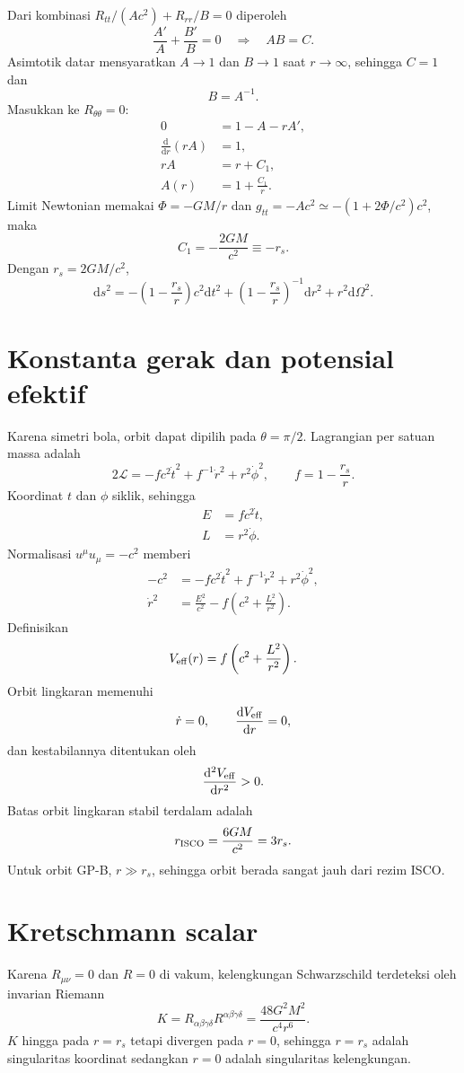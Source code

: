 \documentclass[12pt,a4paper]{report}
\newcommand{\dd}{\mathrm{d}}
\newcommand{\Lag}{\mathcal{L}}
\begin{document}
Dari kombinasi $R_{tt}/(Ac^2)+R_{rr}/B=0$ diperoleh
\[
 \frac{A'}{A}+\frac{B'}B=0
 \quad\Longrightarrow\quad AB=C.
\]
Asimtotik datar mensyaratkan $A\to1$ dan $B\to1$ saat $r\to\infty$, sehingga
$C=1$ dan
\[
 B=A^{-1}.
\]
Masukkan ke $R_{\theta\theta}=0$:
\begin{align}
 0&=1-A-rA',\\
 \frac{\dd}{\dd r}(rA)&=1,\\
 rA&=r+C_1,\\
 A(r)&=1+\frac{C_1}{r}.
\end{align}
Limit Newtonian memakai $\Phi=-GM/r$ dan
$g_{tt}=-A c^2\simeq-(1+2\Phi/c^2)c^2$, maka
\[
 C_1=-\frac{2GM}{c^2}\equiv-r_s.
\]
Dengan $r_s=2GM/c^2$,
\[
 \boxed{
 \dd s^2=-\left(1-\frac{r_s}{r}\right)c^2\dd t^2
 +\left(1-\frac{r_s}{r}\right)^{-1}\dd r^2
 +r^2\dd\Omega^2}.
\]

\section{Konstanta gerak dan potensial efektif}

Karena simetri bola, orbit dapat dipilih pada $\theta=\pi/2$. Lagrangian per
satuan massa adalah
\[
 2\Lag=-f c^2\dot t^2+f^{-1}\dot r^2+r^2\dot\phi^2,
 \qquad f=1-\frac{r_s}{r}.
\]
Koordinat $t$ dan $\phi$ siklik, sehingga
\begin{align}
 E&=fc^2\dot t,\\
 L&=r^2\dot\phi.
\end{align}
Normalisasi $u^\mu u_\mu=-c^2$ memberi
\begin{align}
 -c^2&=-fc^2\dot t^2+f^{-1}\dot r^2+r^2\dot\phi^2,\\
 \dot r^2&=\frac{E^2}{c^2}-f\left(c^2+\frac{L^2}{r^2}\right).
\end{align}
Definisikan
\[
 V_{\rm eff}(r)=f\left(c^2+\frac{L^2}{r^2}\right).
\]
Orbit lingkaran memenuhi
\[
 \dot r=0,\qquad \frac{\dd V_{\rm eff}}{\dd r}=0,
\]
dan kestabilannya ditentukan oleh
\[
 \frac{\dd^2V_{\rm eff}}{\dd r^2}>0.
\]
Batas orbit lingkaran stabil terdalam adalah
\[
 r_{\rm ISCO}=\frac{6GM}{c^2}=3r_s.
\]
Untuk orbit GP-B, $r\gg r_s$, sehingga orbit berada sangat jauh dari rezim ISCO.

\section{Kretschmann scalar}

Karena $R_{\mu\nu}=0$ dan $R=0$ di vakum, kelengkungan Schwarzschild terdeteksi
oleh invarian Riemann
\[
 K=R_{\alpha\beta\gamma\delta}R^{\alpha\beta\gamma\delta}
 =\frac{48G^2M^2}{c^4r^6}.
\]
$K$ hingga pada $r=r_s$ tetapi divergen pada $r=0$, sehingga $r=r_s$ adalah
singularitas koordinat sedangkan $r=0$ adalah singularitas kelengkungan.
\end{document}
